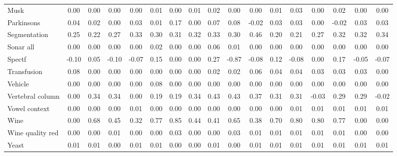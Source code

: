 \documentclass[preprint,12pt]{elsarticle}
\begin{document}
\begin{landscape}
\begin{table}[h!]
{\begin{tabular}{l c ccc ccc ccc ccc ccc}
Musk & 0.00 & 0.00 & 0.00 & 0.00 & 0.01 & 0.00 & 0.01 & 0.02 & 0.00 & 0.00 & 0.01 & 0.03 & 0.00 & 0.02 & 0.00 & 0.00 \\
Parkinsons & 0.04 & 0.02 & 0.00 & 0.03 & 0.01 & 0.17 & 0.00 & 0.07 & 0.08 & -0.02 & 0.03 & 0.03 & 0.00 & -0.02 & 0.03 & 0.03 \\
Segmentation & 0.25 & 0.22 & 0.27 & 0.33 & 0.30 & 0.31 & 0.32 & 0.33 & 0.30 & 0.46 & 0.20 & 0.21 & 0.27 & 0.32 & 0.32 & 0.34 \\
Sonar all & 0.00 & 0.00 & 0.00 & 0.00 & 0.02 & 0.00 & 0.00 & 0.06 & 0.01 & 0.00 & 0.00 & 0.00 & 0.00 & 0.00 & 0.00 & 0.00 \\
Spectf & -0.10 & 0.05 & -0.10 & -0.07 & 0.15 & 0.00 & 0.00 & 0.27 & -0.87 & -0.08 & 0.12 & -0.08 & 0.00 & 0.17 & -0.05 & -0.07 \\
Transfusion & 0.08 & 0.00 & 0.00 & 0.00 & 0.00 & 0.00 & 0.00 & 0.02 & 0.02 & 0.06 & 0.04 & 0.04 & 0.03 & 0.03 & 0.03 & 0.00 \\
Vehicle & 0.00 & 0.00 & 0.00 & 0.00 & 0.08 & 0.00 & 0.00 & 0.00 & 0.00 & 0.00 & 0.00 & 0.00 & 0.00 & 0.00 & 0.00 & 0.00 \\
Vertebral column & 0.00 & 0.34 & 0.34 & 0.00 & 0.19 & 0.19 & 0.34 & 0.43 & 0.43 & 0.37 & 0.31 & 0.31 & -0.03 & 0.29 & 0.29 & -0.02 \\
Vowel context & 0.00 & 0.00 & 0.00 & 0.01 & 0.00 & 0.00 & 0.00 & 0.00 & 0.00 & 0.00 & 0.00 & 0.01 & 0.01 & 0.01 & 0.01 & 0.01 \\
Wine & 0.00 & 0.68 & 0.45 & 0.32 & 0.77 & 0.85 & 0.44 & 0.41 & 0.65 & 0.38 & 0.70 & 0.80 & 0.80 & 0.77 & 0.00 & 0.00 \\
Wine quality red & 0.00 & 0.00 & 0.01 & 0.00 & 0.00 & 0.03 & 0.00 & 0.00 & 0.03 & 0.01 & 0.01 & 0.01 & 0.01 & 0.01 & 0.00 & 0.00 \\
Yeast & 0.01 & 0.01 & 0.00 & 0.01 & 0.01 & 0.00 & 0.00 & 0.01 & 0.00 & 0.01 & 0.01 & 0.01 & 0.01 & 0.01 & 0.01 & 0.01 \\
\bottomrule
\end{tabular}
}
\end{table}
\end{landscape}
\end{document}
